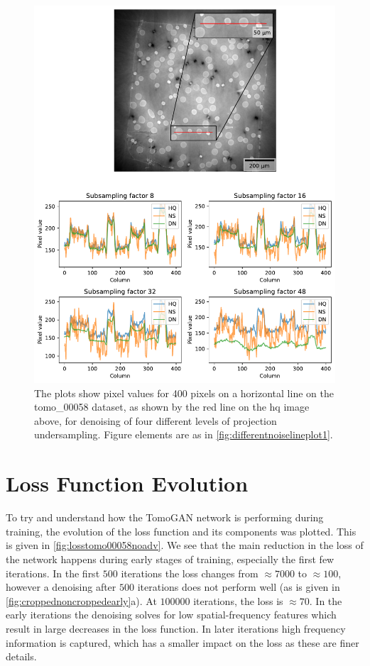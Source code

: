 \begin{figure}[htbp]
  \centering
  \includegraphics[width=.95\textwidth]{figures/differentnoiselineplot2.pdf}
  \caption[Pixel value plot of denoising of different levels of projection undersampling on tomo\_00058]{The plots show pixel values for 400 pixels on a horizontal line on the tomo\_00058 dataset, as shown by the red line on the \gls{hq} image above, for denoising of four different levels of projection undersampling. Figure elements are as in \cref{fig:differentnoiselineplot1}. }
  \label{fig:differentnoiselineplot2}
\end{figure}

\section{Loss Function Evolution}
To try and understand how the TomoGAN network is performing during training, the evolution of the loss function and its components was plotted. This is given in \cref{fig:losstomo00058noadv}. We see that the main reduction in the loss of the network happens during early stages of training, especially the first few iterations. In the first $500$ iterations the loss changes from $\approx 7000$ to $\approx 100$, however a denoising after $500$ iterations does not perform well (as is given in \cref{fig:croppednoncroppedearly}a). At $100000$ iterations, the loss is $\approx 70$. In the early iterations the denoising solves for low spatial-frequency features which result in large decreases in the loss function. In later iterations high frequency information is captured, which has a smaller impact on the loss as these are finer details. 

